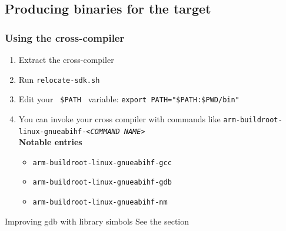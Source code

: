 \subsection{Producing binaries for the target}
\begin{frame}
  \frametitle{Using the cross-compiler}
  \begin{enumerate}
    \item Extract the cross-compiler
    \item Run \texttt{relocate-sdk.sh}
    \item Edit your \texttt{ \$PATH } variable: \texttt{export PATH="\${PATH}:\${PWD}/bin"}
    \item You can invoke your cross compiler with commands like \texttt{arm-buildroot-linux-gnueabihf-\textit{<COMMAND NAME>}} \\
    \textbf{Notable entries}
    \begin{itemize}
      \item \texttt{arm-buildroot-linux-gnueabihf-gcc}
      \item \texttt{arm-buildroot-linux-gnueabihf-gdb}
      \item \texttt{arm-buildroot-linux-gnueabihf-nm}
    \end{itemize}
  \end{enumerate}
  \begin{alertblock}{Improving gdb with library simbols}
    See the section \hyperlink{using gdb}{}
  \end{alertblock}
\end{frame}
